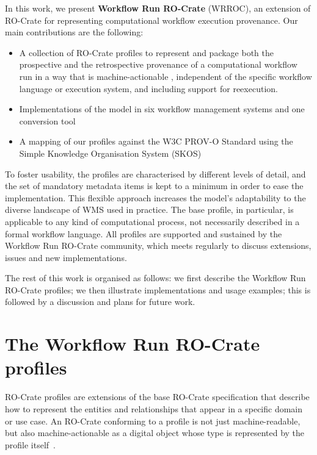 \documentclass[10pt,letterpaper]{article}
\begin{document}
In this work, we present \textbf{Workflow Run RO-Crate} (WRROC), an extension of RO-Crate for representing computational workflow execution provenance.
Our main contributions are the following:

\begin{itemize}
\item   A collection of RO-Crate profiles to represent and package both the prospective and the retrospective provenance of a computational workflow run in a way that is machine-actionable \cite{Batista 2022},  independent of the specific workflow language or execution system, and including support for reexecution.
\item   Implementations of the model in six workflow management systems and one conversion tool
\item   A mapping of our profiles against the W3C PROV-O Standard using the Simple Knowledge Organisation System (SKOS) \cite{Isaac 2009}
\end{itemize}

To foster usability, the profiles are characterised by different levels of detail, and the set of mandatory metadata items is kept to a minimum in order to ease the implementation.
This flexible approach increases the model's adaptability to the diverse landscape of WMS used in practice.
The base profile, in particular, is applicable to any kind of computational process, not necessarily described in a formal workflow language.
All profiles are supported and sustained by the Workflow Run RO-Crate community, which meets regularly to discuss extensions, issues and new implementations.

The rest of this work is organised as follows: we first describe the Workflow Run RO-Crate profiles; we then illustrate implementations and usage examples; this is followed by a discussion and plans for future work.


\section{The Workflow Run RO-Crate profiles}\label{the-workflow-run-ro-crate-profiles}

RO-Crate profiles are extensions of the base RO-Crate specification that describe how to represent the entities and relationships that appear in a specific domain or use case.
An RO-Crate conforming to a profile is not just machine-readable, but also machine-actionable as a digital object whose type is represented by the profile itself~\cite{Soiland-Reyes 2022b}.
\end{document}
